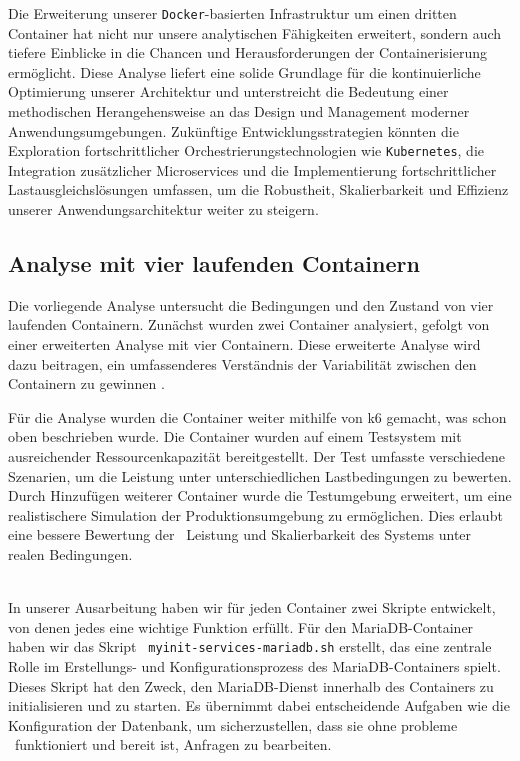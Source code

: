 {Die Erweiterung unserer \texttt{Docker}-basierten Infrastruktur um einen dritten Container hat nicht nur unsere analytischen Fähigkeiten erweitert, sondern auch tiefere Einblicke in die Chancen und Herausforderungen der Containerisierung ermöglicht. Diese Analyse liefert eine solide Grundlage für die kontinuierliche Optimierung unserer Architektur und unterstreicht die Bedeutung einer methodischen Herangehensweise an das Design und Management moderner Anwendungsumgebungen. Zukünftige Entwicklungsstrategien könnten die Exploration fortschrittlicher Orchestrierungstechnologien wie \texttt{Kubernetes}, die Integration zusätzlicher Microservices und die Implementierung fortschrittlicher Lastausgleichslösungen umfassen, um die Robustheit, Skalierbarkeit und Effizienz unserer Anwendungsarchitektur weiter zu steigern.


\subsection{Analyse mit vier laufenden Containern}
Die vorliegende Analyse untersucht die Bedingungen und den Zustand von vier laufenden Containern. Zunächst wurden zwei Container analysiert, gefolgt von einer erweiterten Analyse mit
vier Containern. Diese erweiterte Analyse wird dazu beitragen, ein umfassenderes Verständnis der Variabilität zwischen den Containern zu gewinnen .

Für die Analyse wurden die Container weiter mithilfe von k6 gemacht, was schon oben beschrieben wurde. Die Container wurden auf einem Testsystem mit ausreichender Ressourcenkapazität
bereitgestellt. Der Test umfasste verschiedene Szenarien, um die Leistung unter unterschiedlichen Lastbedingungen zu bewerten.
Durch Hinzufügen weiterer Container wurde die Testumgebung erweitert, um eine realistischere Simulation der Produktionsumgebung zu ermöglichen. Dies erlaubt eine bessere Bewertung der
 Leistung und Skalierbarkeit des Systems unter realen Bedingungen.

\\

In unserer Ausarbeitung haben wir für jeden Container zwei Skripte entwickelt, von denen jedes eine wichtige Funktion erfüllt. Für den MariaDB-Container haben wir das Skript \texttt{
myinit-services-mariadb.sh} erstellt, das eine zentrale Rolle im Erstellungs- und Konfigurationsprozess des MariaDB-Containers spielt. Dieses Skript hat den Zweck, den MariaDB-Dienst
innerhalb des Containers zu initialisieren und zu starten. Es übernimmt dabei entscheidende Aufgaben wie die Konfiguration der Datenbank, um sicherzustellen, dass sie ohne probleme  funktioniert und bereit ist, Anfragen zu bearbeiten.

}
